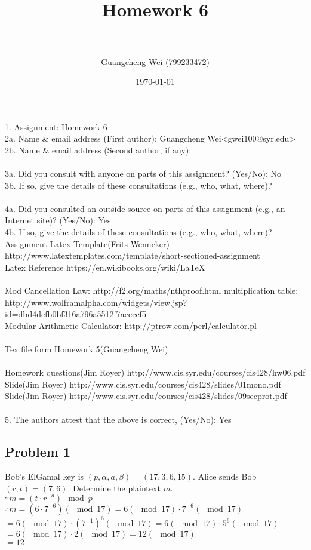\documentclass[paper=a4, fontsize=11pt]{scrartcl} %
\title{ 
\horrule{0.5pt} \\[0.4cm] %
\huge Homework 6\\ %
\horrule{2pt} \\[0.5cm] %
}
\author{Guangcheng Wei (799233472)} %
\date{\normalsize\today} %
\numberwithin{equation}{section} %
\numberwithin{figure}{section} %
\newcommand{\problem}[1]{\subsection *{Problem #1}}
\begin{document}
\maketitle %

1.  Assignment: Homework 6\\

2a. Name \& email address (First author): Guangcheng Wei<gwei100@syr.edu> \\
2b. Name \& email address (Second author, if any):\\
\\
3a. Did you consult with anyone on parts of this assignment? (Yes/No): No\\
3b. If so, give the details of these consultations (e.g., who, what,    where)?\\
\\
4a. Did you consulted an outside source on parts of this assignment     (e.g., an Internet site)?  (Yes/No): Yes\\
4b. If so, give the details of these consultations (e.g., who, what,     where)?
\\
Assignment Latex Template(Frits Wenneker) http://www.latextemplates.com/template/short-sectioned-assignment\\
Latex Reference https://en.wikibooks.org/wiki/LaTeX\\
\\
Mod Cancellation Law: http://f2.org/maths/nthproof.html
multiplication table: http://www.wolframalpha.com/widgets/view.jsp?id=dbd4dcfb0bf316a796a5512f7aeeccf5\\
Modular Arithmetic Calculator: http://ptrow.com/perl/calculator.pl\\
\\
Tex file form Homework 5(Guangcheng Wei)\\
\\
Homework questions(Jim Royer) http://www.cis.syr.edu/courses/cis428/hw06.pdf\\
Slide(Jim Royer) http://www.cis.syr.edu/courses/cis428/slides/01mono.pdf\\
Slide(Jim Royer) http://www.cis.syr.edu/courses/cis428/slides/09secprot.pdf\\
\\
5.  The authors attest that the above is correct, (Yes/No): Yes\\

\pagebreak
\problem 1
Bob's ElGamal key is $(p, \alpha, a, \beta) = (17, 3, 6, 15)$. Alice sends Bob $(r, t) = (7, 6)$. Determine the plaintext $m$.\\
$\because m = (t\cdot r^{-a}) \mod p$\\
$\therefore m = (6 \cdot 7^{-6}) (\mod 17) = 6 (\mod 17) \cdot 7^{-6} (\mod 17)$\\
$= 6 (\mod 17) \cdot (7^{-1})^{6} (\mod 17) = 6 (\mod 17) \cdot 5^{6} (\mod 17)$\\
$= 6 (\mod 17) \cdot 2 (\mod 17) = 12 (\mod 17)$\\
$= 12$\\
\end{document}
